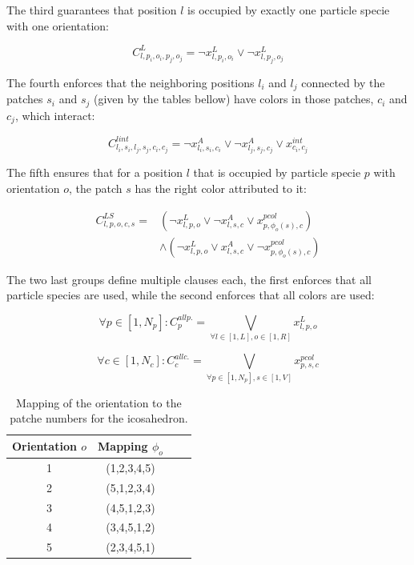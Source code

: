 \documentclass[a4paper, amsfonts, amssymb, amsmath, reprint, showkeys, nofootinbib, oneside]{revtex4-1}
\begin{document}
The third guarantees that position $l$ is occupied by exactly one particle specie with one orientation:

\begin{equation}
C^{L}_{l,p_i,o_i,p_j,o_j}=\neg x_{l,p_i,o_i}^{L} \vee \neg x_{l,p_j,o_j}^{L}
\end{equation}

The fourth enforces that the neighboring positions $l_i$ and $l_j$ connected by the patches $s_i$ and $s_j$ (given by the tables bellow) have colors in those patches, $c_i$ and $c_j$, which interact:

\begin{equation}
C^{lint}_{l_i,s_i,l_j,s_j,c_i,c_j}=\neg x_{l_i,s_i,c_i}^{A} \vee \neg x_{l_j,s_j,c_j}^{A} \vee x_{c_i,c_j}^{int}
\end{equation}

The fifth ensures that for a position $l$ that is occupied by particle specie $p$ with orientation $o$, the patch $s$ has the right color attributed to it:

\begin{equation}
\begin{split}
C^{LS}_{l,p,o,c,s}= & ( \neg x_{l,p,o}^{L} \vee \neg x_{l,s,c}^{A} \vee x_{p,\phi_o(s), c}^{pcol} ) \\ 
& \wedge ( \neg x_{l,p,o}^{L} \vee x_{l,s,c}^{A} \vee \neg x_{p,\phi_o(s), c}^{pcol} )
\end{split}
\end{equation}

The two last groups define multiple clauses each, the first enforces that all particle species are used, while the second enforces that all colors are used:

\begin{equation}
\forall p\in [1, N_p]:C_p^{all p.}= \underset{\forall l \in [1,L], o\in [1,R]}{\bigvee} x_{l,p,o}^L
\end{equation}

\begin{equation}
\forall c\in [1, N_c]:C_c^{all c.}= \underset{\forall p \in [1,N_p], s\in [1,V]}{\bigvee} x_{p,s,c}^{pcol}
\end{equation}

\begin{table}[h!]
	\begin{center}
		\begin{tabular}{ cccc } 
			\hline
			Orientation $o$ & Mapping $\phi_o$ \\
			\hline
			1 & (1,2,3,4,5) \\ 
			2 & (5,1,2,3,4) \\ 
			3 & (4,5,1,2,3) \\ 
			4 & (3,4,5,1,2) \\
			5 & (2,3,4,5,1) \\
			\hline
		\end{tabular}
		\caption{Mapping of the orientation to the patche numbers for the icosahedron.}
	\end{center}
\end{table}
\end{document}
